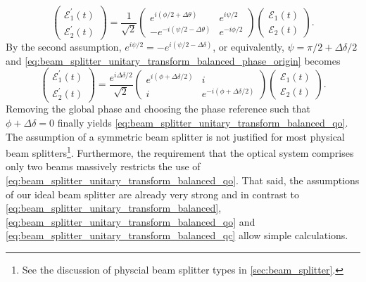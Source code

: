 \begin{equation}
    \begin{pmatrix}
        \mathcal{E}_1^\prime(t)
        \\
        \mathcal{E}_2^\prime(t)
    \end{pmatrix}
    =
    \frac{1}{\sqrt{2}}
    \begin{pmatrix}
        e^{i(\phi/2+\Delta\theta)} & e^{i\psi/2}
        \\
        -e^{-i(\psi/2-\Delta\theta)} & e^{-i\phi/2}
    \end{pmatrix}
    \begin{pmatrix}
        \mathcal{E}_1(t)
        \\
        \mathcal{E}_2(t)
    \end{pmatrix}
    \label{eq:beam_splitter_unitary_transform_balanced_phase_origin}.
\end{equation}
By the second assumption, $e^{i\psi/2}=-e^{i(\psi/2-\Delta\delta)}$, or equivalently, $\psi=\pi/2+\Delta\delta/2$ and \cref{eq:beam_splitter_unitary_transform_balanced_phase_origin} becomes
\begin{equation}
    \begin{pmatrix}
        \mathcal{E}_1^\prime(t)
        \\
        \mathcal{E}_2^\prime(t)
    \end{pmatrix}
    =
    \frac{e^{i\Delta\delta/2}}{\sqrt{2}}
    \begin{pmatrix}
        e^{i(\phi+\Delta\delta/2)} & i
        \\
        i & e^{-i(\phi+\Delta\delta/2)}
    \end{pmatrix}
    \begin{pmatrix}
        \mathcal{E}_1(t)
        \\
        \mathcal{E}_2(t)
    \end{pmatrix}
    .
\end{equation}
Removing the global phase and choosing the phase reference such that $\phi+\Delta\delta=0$ finally yields \cref{eq:beam_splitter_unitary_transform_balanced_qo}.
The assumption of a symmetric beam splitter is not justified for most physical beam splitters\footnote{See the discussion of physcial beam splitter types in \cref{sec:beam_splitter}.}.
Furthermore, the requirement that the optical system comprises only two beams massively restricts the use of \cref{eq:beam_splitter_unitary_transform_balanced_qo}.
That said, the assumptions of our ideal beam splitter are already very strong and in contrast to \cref{eq:beam_splitter_unitary_transform_balanced}, \cref{eq:beam_splitter_unitary_transform_balanced_qo} and \cref{eq:beam_splitter_unitary_transform_balanced_qc} allow simple calculations.

